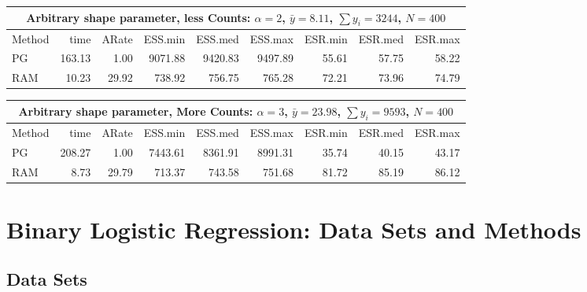 \documentclass[11pt]{article}
\begin{document}
\begin{table}
\label{tab:nb-real-shape}
\centering
\begin{tabular}{l r r r r r r r r } 
\hline
\multicolumn{9}{c}{Arbitrary shape parameter, less Counts: $\alpha = 2$, $\bar y = 8.11$, $\sum y_i = 3244$, $N=400$} \\
\hline
          Method  &     time &    ARate &  ESS.min &  ESS.med &  ESS.max &  ESR.min &  ESR.med &  ESR.max \\ 
              PG  &   163.13 &     1.00 &  9071.88 &  9420.83 &  9497.89 &    55.61 &    57.75 &    58.22 \\ 
             RAM  &    10.23 &    29.92 &   738.92 &   756.75 &   765.28 &    72.21 &    73.96 &    74.79
 \end{tabular}

\begin{tabular}{l r r r r r r r r } 
\hline
\multicolumn{9}{c}{Arbitrary shape parameter, More Counts: $\alpha = 3$, $\bar y = 23.98$, $\sum y_i = 9593$, $N=400$} \\
\hline
          Method  &     time &    ARate &  ESS.min &  ESS.med &  ESS.max &  ESR.min &  ESR.med &  ESR.max \\ 
              PG  &   208.27 &     1.00 &  7443.61 &  8361.91 &  8991.31 &    35.74 &    40.15 &    43.17 \\ 
             RAM  &     8.73 &    29.79 &   713.37 &   743.58 &   751.68 &    81.72 &    85.19 &    86.12
 \end{tabular}
\end{table}

\appendix

\section{Binary Logistic Regression: Data Sets and Methods}
\label{sec:blogit-datasets}

\subsection{Data Sets}
\end{document}
